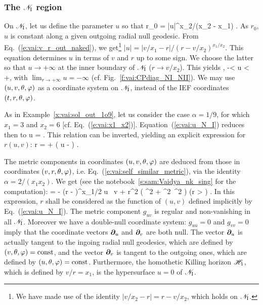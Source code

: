 \subsubsection{The $\mathscr{N}_{\rm I}$ region}

On $\mathscr{N}_{\rm I}$, let us define the parameter $u$ so that
\be \label{e:vai:def_u_tilde_c}
    r_0 = |u|^{x_2/(x_2 - x_1)} .
\ee
As $r_0$, $u$ is constant along a given outgoing radial null geodesic.
From Eq.~(\ref{e:vai:v_r_out_naked}), we get\footnote{We have made use of
the identity $|v/x_2 - r| = r - v/x_2$, which holds on $ \mathscr{N}_{\rm I}$.}
$|u| = |v/x_1 - r| / (r - v/x_2)^{x_1/x_2}$. This equation determines
$u$ in terms of $v$ and $r$ up to some sign. We choose the latter so that
$u \to +\infty$ at the inner boundary of $\mathscr{N}_{\rm I}$
($r \to v/x_2$). This yields
\be \label{e:vai:u_N_I}
    , \quad -\infty < u < +\infty ,
\ee
with $\lim_{r\to +\infty} u = - \infty$ (cf. Fig.~\ref{f:vai:CPdiag_NI_NII}).
We may use $(u, v, \theta, \varphi)$ as a coordinate system on $\mathscr{N}_{\rm I}$,
instead of the IEF coordinates $(t, r, \theta, \varphi)$.

\begin{example} \label{x:vai:u_r_1o9}
As in Example~\ref{x:vai:sol_out_1o9}, let us consider the case $\alpha=1/9$,
for which $x_1 = 3$ and $x_2 = 6$ [cf. Eq.~(\ref{e:vai:x1_x2})]. Equation~(\ref{e:vai:u_N_I})
reduces then to
\be
    u =  .
\ee
This relation can be inverted, yielding an explicit expression for $r(u, v)$:
\be \label{e:vai:r_uv_1o9}
    r =  +  \left( u -  \right) .
\ee
\end{example}

The metric components in coordinates $(u, v, \theta, \varphi)$
are deduced from those in coordinates $(v, r, \theta, \varphi)$, i.e.
Eq.~(\ref{e:vai:self_similar_metric}), via
the identity $\alpha=2/(x_1 x_2)$. We get
(see the notebook~\ref{s:sam:Vaidya_nk_sing} for the computation):
\be \label{e:vai:metric_N_I}
     = -  \left(r -  \right)^{x_1/2}
        \dd u \, \dd v
        + r^2 \left( \dd\th^2 + \sin^2\th\, \dd\ph^2 \right) \qquad
        \left(r > \right) .
\ee
In this expression, $r$ shall be considered as the function of $(u,v)$ defined
implicitly by Eq.~(\ref{e:vai:u_N_I}).
The metric component $g_{uv}$ is regular and non-vanishing in all $\mathscr{N}_{\rm I}$.
Moreover we have a double-null coordinate system:
$g_{uu} = 0$ and $g_{vv} = 0$ imply that the coordinate vectors $\bm{\partial}_u$
and $\bm{\partial}_v$ are both null. The vector $\bm{\partial}_u$ is actually tangent to the
ingoing radial null geodesics, which are defined by $(v,\theta,\varphi) = \mathrm{const}$,
and the vector $\bm{\partial}_v$ is tangent to the outgoing ones, which are defined
by $(u,\theta,\varphi) = \mathrm{const}$. Furthermore, the homothetic Killing horizon $\mathscr{H}_1$, which is defined by $v/r = x_1$, is the hypersurface
$u = 0$ of $\mathscr{N}_{\rm I}$.



